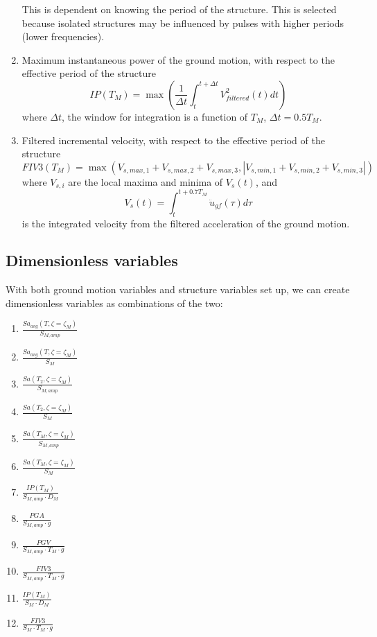 \documentclass{article}
\begin{document}
\begin{enumerate}
		This is dependent on knowing the period of the structure. This is selected because isolated structures may be influenced by pulses with higher periods (lower frequencies).
		\item Maximum instantaneous power of the ground motion, with respect to the effective period of the structure
			$$ IP(T_M) = \max \left ( \frac{1}{\Delta t} \int_{t}^{t + \Delta t} V_{filtered}^2 (t) dt \right ) $$
		where $\Delta t$, the window for integration is a function of $T_M$, $\Delta t = 0.5 T_M$.
		\item Filtered incremental velocity, with respect to the effective period of the structure
			$$ FIV3(T_M) = \max \left ( V_{s, max, 1} + V_{s, max, 2} + V_{s, max, 3}, \left | V_{s, min, 1} + V_{s, min, 2} + V_{s, min, 3} \right | \right )$$
		where $V_{s, i}$ are the local maxima and minima of $V_s(t)$, and 
			$$ V_s(t) = \int_{t}^{t + 0.7 T_M} \ddot{u}_{gf} (\tau) d \tau $$
		is the integrated velocity from the filtered acceleration of the ground motion.
	\end{enumerate}
	
\subsection{Dimensionless variables}

With both ground motion variables and structure variables set up, we can create dimensionless variables as combinations of the two:

	\begin{enumerate}
		\item $\frac{ Sa_{avg}(T, \zeta = \zeta_M) }{ S_{M, amp} }$
		\item $\frac{ Sa_{avg}(T, \zeta = \zeta_M) }{ S_{M} }$
		\item $\frac{ Sa(T_2, \zeta = \zeta_M) }{ S_{M, amp} }$
		\item $\frac{ Sa(T_2, \zeta = \zeta_M) }{ S_{M} }$
		\item $\frac{ Sa(T_M, \zeta = \zeta_M) }{ S_{M, amp} }$
		\item $\frac{ Sa(T_M, \zeta = \zeta_M) }{ S_{M} }$
		\item $\frac{IP(T_M)}{ S_{M, amp} \cdot  D_M}$
		\item $\frac{PGA}{ S_{M, amp} \cdot g}$
		\item $\frac{PGV}{ S_{M, amp} \cdot T_M \cdot g}$
		\item $\frac{FIV3}{ S_{M, amp} \cdot T_M \cdot g}$
		\item $\frac{IP(T_M)}{ S_{M} \cdot  D_M}$
		\item $\frac{FIV3}{ S_{M} \cdot T_M \cdot g}$
	\end{enumerate}
	
\end{document}
